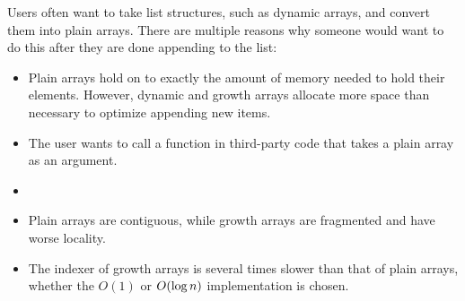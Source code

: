 \HdrDescription

Users often want to take list structures, such as dynamic arrays, and convert them into plain arrays. There are multiple reasons why someone would want to do this after they are done appending to the list:

\begin{itemize}
	\item Plain arrays hold on to exactly the amount of memory needed to hold their elements. However, dynamic and growth arrays allocate more space than necessary to optimize appending new items.
	\item The user wants to call a function in third-party code that takes a plain array as an argument.
	\item
	\item Plain arrays are contiguous, while growth arrays are fragmented and have worse locality.
	\item The indexer of growth arrays is several times slower than that of plain arrays, whether the $O(1)$ or $O(\log n)$ implementation is chosen.
\end{itemize}